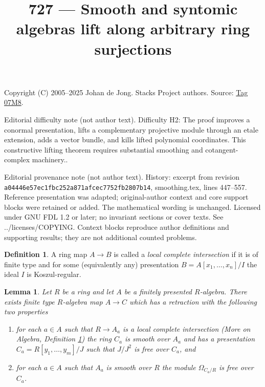 \documentclass{amsart}
\theoremstyle{plain}
\newtheorem{lemma}[subsection]{Lemma}
\theoremstyle{definition}
\newtheorem{definition}[subsection]{Definition}
\theoremstyle{remark}
\numberwithin{equation}{subsection}
\begin{document}
\title[Stacks Project, Tag 07M8]{727 --- Smooth and syntomic algebras lift along arbitrary ring surjections}
\maketitle
\noindent Copyright (C) 2005--2025 Johan de Jong. Stacks Project authors. Source: \href{https://stacks.math.columbia.edu/tag/07M8}{Tag 07M8}.

\noindent Editorial difficulty note (not author text). Difficulty H2: The proof improves a conormal presentation, lifts a complementary projective module through an etale extension, adds a vector bundle, and kills lifted polynomial coordinates. This constructive lifting theorem requires substantial smoothing and cotangent-complex machinery..

\noindent Editorial provenance note (not author text). History: excerpt from revision \texttt{a0444\allowbreak 6e57e\allowbreak c1fbc\allowbreak 252a8\allowbreak 71afc\allowbreak ec775\allowbreak 2fb28\allowbreak 07b14}, smoothing.tex, lines 447--557. Reference presentation was adapted; original-author context and core support blocks were retained or added. The mathematical wording is unchanged. Licensed under GNU FDL 1.2 or later; no invariant sections or cover texts. See ../licenses/COPYING. Context blocks reproduce author definitions and supporting results; they are not additional counted problems.

\begin{definition}
\label{more-algebra-definition-local-complete-intersection}
A ring map $A \to B$ is called a {\it local complete intersection}
if it is of finite type and for some (equivalently any) presentation
$B = A[x_1, \ldots, x_n]/I$ the ideal $I$ is Koszul-regular.
\end{definition}

\begin{lemma}
\label{lemma-improve-presentation}
Let $R$ be a ring and let $A$ be a finitely presented $R$-algebra.
There exists finite type $R$-algebra map $A \to C$ which has a
retraction with the following two properties
\begin{enumerate}
\item for each $a \in A$ such that $R \to A_a$ is a local complete
intersection (More on Algebra, Definition
\ref{more-algebra-definition-local-complete-intersection})
the ring $C_a$ is smooth over $A_a$ and has a presentation
$C_a = R[y_1, \ldots, y_m]/J$ such that $J/J^2$ is free over $C_a$, and
\item for each $a \in A$ such that $A_a$ is smooth over $R$ the
module $\Omega_{C_a/R}$ is free over $C_a$.
\end{enumerate}
\end{lemma}
\end{document}
